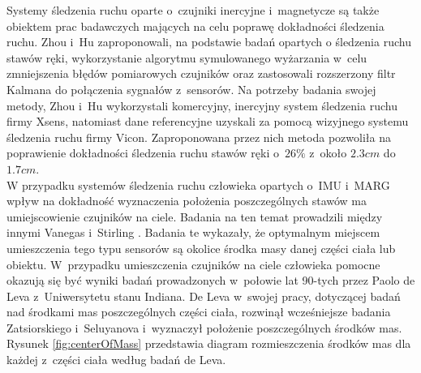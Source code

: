 Systemy śledzenia ruchu oparte o~czujniki inercyjne i~magnetycze są także obiektem prac badawczych mających na celu poprawę dokładności śledzenia ruchu. Zhou i~Hu \cite{Zhou2005,Zhou2006} zaproponowali, na podstawie badań opartych o śledzenia ruchu stawów ręki, wykorzystanie algorytmu symulowanego wyżarzania w~celu zmniejszenia błędów pomiarowych czujników oraz zastosowali rozszerzony filtr Kalmana do połączenia sygnałów z~sensorów. Na potrzeby badania swojej metody, Zhou i~Hu wykorzystali komercyjny, inercyjny system śledzenia ruchu firmy Xsens, natomiast dane referencyjne uzyskali za pomocą wizyjnego systemu śledzenia ruchu firmy Vicon. Zaproponowana przez nich metoda pozwoliła na poprawienie dokładności śledzenia ruchu stawów ręki o~$26\%$ z~około $2.3 cm$ do $1.7 cm$.\\

W przypadku systemów śledzenia ruchu człowieka opartych o~IMU i~MARG wpływ na dokładność wyznaczenia położenia poszczególnych stawów ma umiejscowienie czujników na ciele. Badania na ten temat prowadzili między innymi Vanegas i~Stirling \cite{Vanegas2015}. Badania te wykazały, że optymalnym miejscem umieszczenia tego typu sensorów są okolice środka masy danej części ciała lub obiektu. W~przypadku umieszczenia czujników na ciele człowieka pomocne okazują się być wyniki badań prowadzonych w~połowie lat 90-tych przez Paolo de Leva z~Uniwersytetu stanu Indiana. De Leva w~swojej pracy, dotyczącej badań nad środkami mas poszczególnych części ciała\cite{DeLeva1996}, rozwinął wcześniejsze badania Zatsiorskiego i~Seluyanova \cite{549} i~wyznaczył położenie poszczególnych środków mas. Rysunek \ref{fig:centerOfMass} przedstawia diagram rozmieszczenia środków mas dla każdej z~części ciała według badań de Leva.

